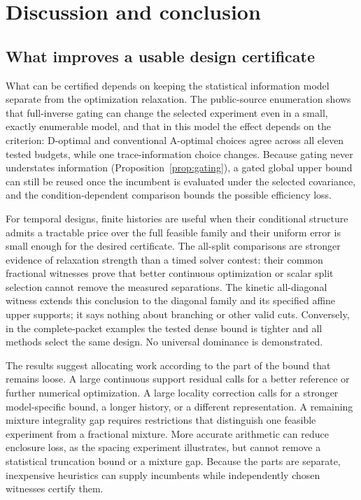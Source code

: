 \section{Discussion and conclusion}\label{sec:discussion}

\subsection{What improves a usable design certificate}

What can be certified depends on keeping the statistical information model
separate from the optimization relaxation. The public-source enumeration
shows that full-inverse gating can change the selected experiment even in a
small, exactly enumerable model, and that in this model the effect depends
on the criterion: D-optimal and conventional A-optimal choices agree across
all eleven tested budgets, while one trace-information choice changes. Because gating never
understates information (Proposition~\ref{prop:gating}), a gated global upper
bound can still be reused once the incumbent is evaluated under the selected
covariance, and the condition-dependent comparison bounds the possible
efficiency loss.

For temporal designs, finite histories are useful when their conditional
structure admits a tractable price over the full feasible family and their
uniform error is small enough for the desired certificate. The all-split
comparisons are stronger evidence of relaxation strength than a timed solver
contest: their common fractional witnesses prove that better continuous
optimization or scalar split selection cannot remove the measured
separations. The kinetic all-diagonal witness extends this conclusion to the
diagonal family and its specified affine upper supports; it says nothing
about branching or other valid cuts. Conversely, in the complete-packet
examples the tested dense bound is tighter and all methods select the same
design. No universal dominance is demonstrated.

The results suggest allocating work according to the part of the bound that
remains loose. A large continuous support residual calls for a better reference
or further numerical optimization. A large locality correction calls for a
stronger model-specific bound, a longer history, or a different representation.
A remaining mixture integrality gap requires restrictions that distinguish
one feasible experiment from a fractional mixture. More accurate arithmetic
can reduce enclosure loss, as the spacing experiment illustrates, but cannot
remove a statistical truncation bound or a mixture gap. Because the parts are
separate, inexpensive heuristics can supply incumbents while independently
chosen witnesses certify them.


